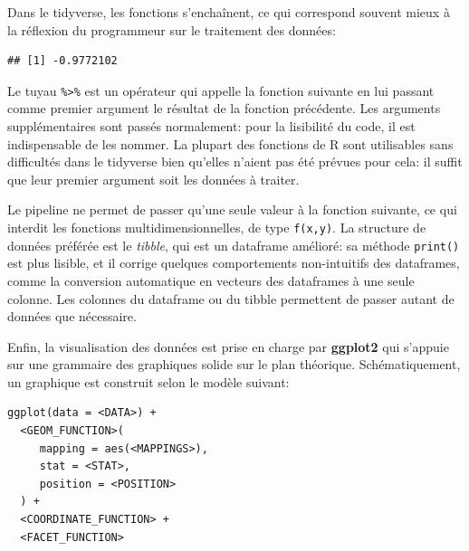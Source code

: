 \documentclass[
  12pt,
  french,
  a4paper,
  extrafontsizes,onecolumn,openright
  ]{memoir}
\newenvironment{Shaded}{\begin{snugshade}}{\end{snugshade}}
\newcommand{\CommentTok}[1]{\textcolor[rgb]{0.56,0.35,0.01}{\textit{#1}}}
\newcommand{\DataTypeTok}[1]{\textcolor[rgb]{0.13,0.29,0.53}{#1}}
\newcommand{\DecValTok}[1]{\textcolor[rgb]{0.00,0.00,0.81}{#1}}
\newcommand{\KeywordTok}[1]{\textcolor[rgb]{0.13,0.29,0.53}{\textbf{#1}}}
\newcommand{\NormalTok}[1]{#1}
\newcommand{\OperatorTok}[1]{\textcolor[rgb]{0.81,0.36,0.00}{\textbf{#1}}}
\newcommand{\StringTok}[1]{\textcolor[rgb]{0.31,0.60,0.02}{#1}}
\begin{document}
\normalsize

Dans le tidyverse, les fonctions s'enchaînent, ce qui correspond souvent mieux à la réflexion du programmeur sur le traitement des données:

\scriptsize

\begin{Shaded}
\end{Shaded}

\begin{verbatim}
## [1] -0.9772102
\end{verbatim}

\normalsize

Le tuyau \texttt{\%\textgreater{}\%} est un opérateur qui appelle la fonction suivante en lui passant comme premier argument le résultat de la fonction précédente.
Les arguments supplémentaires sont passés normalement: pour la lisibilité du code, il est indispensable de les nommer.
La plupart des fonctions de R sont utilisables sans difficultés dans le tidyverse bien qu'elles n'aient pas été prévues pour cela: il suffit que leur premier argument soit les données à traiter.

Le pipeline ne permet de passer qu'une seule valeur à la fonction suivante, ce qui interdit les fonctions multidimensionnelles, de type \texttt{f(x,y)}.
La structure de données préférée est le \emph{tibble}, qui est un dataframe amélioré: sa méthode \texttt{print()} est plus lisible, et il corrige quelques comportements non-intuitifs des dataframes, comme la conversion automatique en vecteurs des dataframes à une seule colonne.
Les colonnes du dataframe ou du tibble permettent de passer autant de données que nécessaire.

Enfin, la visualisation des données est prise en charge par \textbf{ggplot2} qui s'appuie sur une grammaire des graphiques \autocite{Wickham2010} solide sur le plan théorique.
Schématiquement, un graphique est construit selon le modèle suivant:

\begin{verbatim}
ggplot(data = <DATA>) + 
  <GEOM_FUNCTION>(
     mapping = aes(<MAPPINGS>),
     stat = <STAT>, 
     position = <POSITION>
  ) +
  <COORDINATE_FUNCTION> +
  <FACET_FUNCTION>
\end{verbatim}
\end{document}

